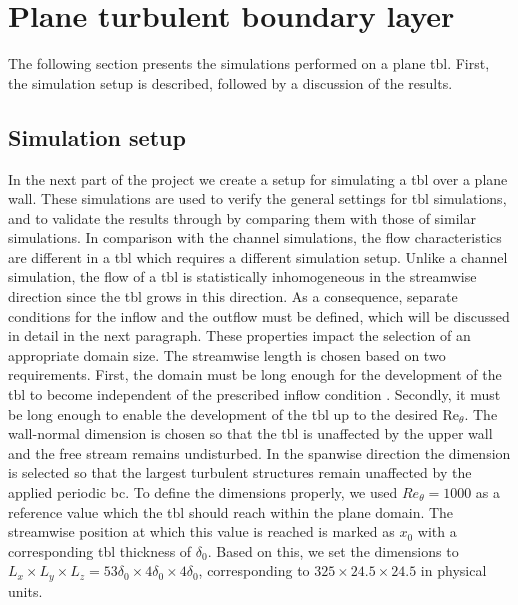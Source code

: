 \section{Plane turbulent boundary layer}\label{sec:planeTBL}

The following section presents the simulations performed on a plane  \acrshort{tbl}.
First, the simulation setup is described, followed by a discussion of the results.


\subsection{Simulation setup}

In the next part of the project we create a setup for simulating a \acrshort{tbl} over a plane wall.
These simulations are used to verify the general settings for \acrshort{tbl} simulations, and to validate the results through by comparing them with those of similar simulations.
In comparison with the channel simulations, the flow characteristics are different in a \acrshort{tbl} which requires a  different simulation setup.
Unlike a channel simulation, the flow of a \acrshort{tbl} is statistically inhomogeneous in the streamwise direction since the \acrshort{tbl} grows in this direction.
As a consequence, separate conditions for the inflow and the outflow must be defined, which will be discussed in detail in the next paragraph.
These properties impact the selection of an appropriate domain size.
The streamwise length is chosen based on two requirements.
First, the domain  must be long enough for  the development of the \acrshort{tbl} to become independent of the prescribed inflow condition .
Secondly,  it must be long enough to enable the development of the \acrshort{tbl} up to the desired $\mathrm{Re}_{\theta}$.
The wall-normal dimension is chosen so that the \acrshort{tbl} is unaffected by the upper wall and the free stream remains undisturbed. 
In the spanwise direction the dimension is selected so that the largest turbulent structures remain unaffected by the applied periodic \acrlong{bc}.
To define the dimensions properly, we used $Re_{\theta} = 1000$ as a reference value which the \acrshort{tbl} should reach within the plane domain.
The streamwise position at which this value is reached is marked as $x_0$ with a corresponding \acrshort{tbl} thickness of $\delta_0$.
Based on this, we set the dimensions to $L_x \times L_y \times L_z = 53\delta_{0} \times 4\delta_{0} \times 4\delta_{0}$, corresponding to $325 \times 24.5 \times 24.5$ in physical units.
